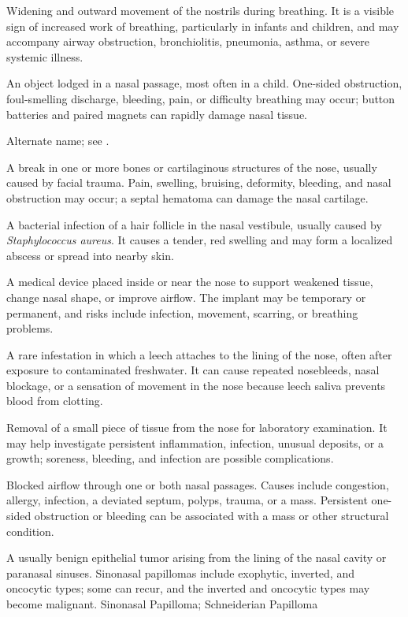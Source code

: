 Widening and outward movement of the nostrils during breathing. It is a visible sign of
increased work of breathing, particularly in infants and children, and may accompany
airway obstruction, bronchiolitis, pneumonia, asthma, or severe systemic illness.

 An object lodged in a nasal passage, most often in a child. One-sided obstruction, foul-smelling discharge, bleeding, pain, or difficulty breathing may occur; button batteries and paired magnets can rapidly damage nasal tissue.

 Alternate name; see .

 A break in one or more bones or cartilaginous structures of the nose, usually caused by facial trauma. Pain, swelling, bruising, deformity, bleeding, and nasal obstruction may occur; a septal hematoma can damage the nasal cartilage.

 A bacterial infection of a hair follicle in the nasal vestibule, usually caused by \textit{Staphylococcus aureus}. It causes a tender, red swelling and may form a localized abscess or spread into nearby skin.

 A medical device placed inside or near the nose to support weakened tissue, change nasal shape, or improve airflow. The implant may be temporary or permanent, and risks include infection, movement, scarring, or breathing problems.

 A rare infestation in which a leech attaches to the lining of the nose, often after exposure to contaminated freshwater. It can cause repeated nosebleeds, nasal blockage, or a sensation of movement in the nose because leech saliva prevents blood from clotting.

 Removal of a small piece of tissue from the nose for laboratory examination. It may help investigate persistent inflammation, infection, unusual deposits, or a growth; soreness, bleeding, and infection are possible complications.

 Blocked airflow through one or both nasal passages. Causes include congestion, allergy, infection, a
deviated septum, polyps, trauma, or a mass. Persistent one-sided obstruction or bleeding can be
associated with a mass or other structural condition.

 A usually benign epithelial tumor arising from the lining of the nasal cavity or paranasal sinuses. Sinonasal papillomas include exophytic, inverted, and oncocytic types; some can recur, and the inverted and oncocytic types may become malignant.
\synonyms
Sinonasal Papilloma; Schneiderian Papilloma

